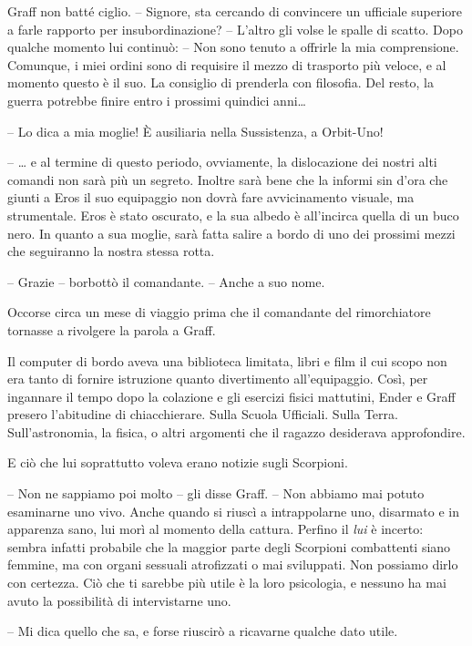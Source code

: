 {Graff non batté ciglio. -- Signore, sta cercando di convincere un
	ufficiale superiore a farle rapporto per insubordinazione? -- L'altro
	gli volse le spalle di scatto. Dopo qualche momento lui continuò: -- Non
	sono tenuto a offrirle la mia comprensione. Comunque, i miei ordini sono
	di requisire il mezzo di trasporto più veloce, e al momento questo è il
	suo. La consiglio di prenderla con filosofia. Del resto, la guerra
	potrebbe finire entro i prossimi quindici anni\ldots{}}

{-- Lo dica a mia moglie! È ausiliaria nella Sussistenza, a Orbit-Uno!}

{-- \ldots{} e al termine di questo periodo, ovviamente, la dislocazione
	dei nostri alti comandi non sarà più un segreto. Inoltre sarà bene che
	la informi sin d'ora che giunti a Eros il suo equipaggio non dovrà fare
	avvicinamento visuale, ma strumentale. Eros è stato oscurato, e la sua
	albedo è all'incirca quella di un buco nero. In quanto a sua moglie,
	sarà fatta salire a bordo di uno dei prossimi mezzi che seguiranno la
	nostra stessa rotta.}

{-- Grazie -- borbottò il comandante. -- Anche a suo nome.}

{Occorse circa un mese di viaggio prima che il comandante del
	rimorchiatore tornasse a rivolgere la parola a Graff.}

{Il computer di bordo aveva una biblioteca limitata, libri e film il cui
	scopo non era tanto di fornire istruzione quanto divertimento
	all'equipaggio. Così, per ingannare il tempo dopo la colazione e gli
	esercizi fisici mattutini, Ender e Graff presero l'abitudine di
	chiacchierare. Sulla Scuola Ufficiali. Sulla Terra. Sull'astronomia, la
	fisica, o altri argomenti che il ragazzo desiderava approfondire.}

{E ciò che lui soprattutto voleva erano notizie sugli Scorpioni.}

{-- Non ne sappiamo poi molto -- gli disse Graff. -- Non abbiamo mai
	potuto esaminarne uno vivo. Anche quando si riuscì a intrappolarne uno,
	disarmato e in apparenza sano, lui morì al momento della cattura.
	Perfino il \emph{lui} è incerto: sembra infatti probabile che la maggior
	parte degli Scorpioni combattenti siano femmine, ma con organi sessuali
	atrofizzati o mai sviluppati. Non possiamo dirlo con certezza. Ciò che
	ti sarebbe più utile è la loro psicologia, e nessuno ha mai avuto la
	possibilità di intervistarne uno.}

{-- Mi dica quello che sa, e forse riuscirò a ricavarne qualche dato
	utile.}

